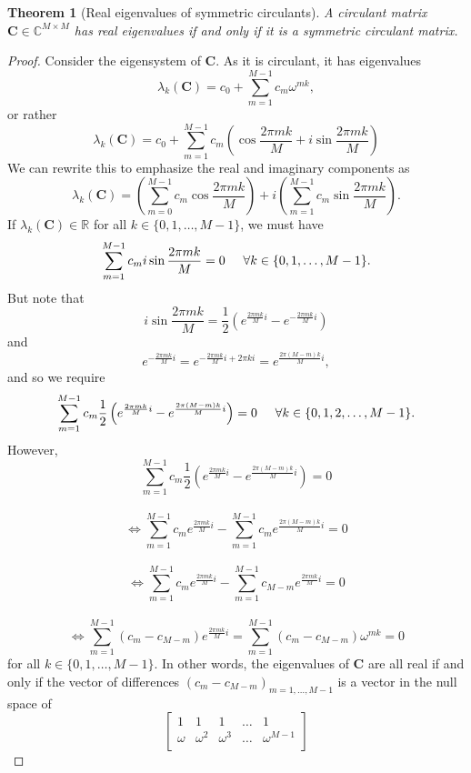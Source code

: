 \documentclass[letterpaper,12pt,oneside,final]{article}
\newtheorem{theorem}{Theorem}
\newcommand{\m}[1]{\mathbf{#1}}               %
\newcommand{\field}[1]{\mathbb{#1}}
\newcommand{\Reals}{\field{R}}
\newcommand{\Complex}{\field{C}}
\begin{document}
\begin{theorem}[Real eigenvalues of symmetric circulants] \label{thm:symmEigen}
  A circulant matrix $\m{C} \in \Complex^{M \times M}$ has real eigenvalues if and only if it is a symmetric circulant matrix.
\end{theorem}
\begin{proof}
  Consider the eigensystem of $\m{C}$. As it is circulant, it has eigenvalues
  $$\lambda_k (\m{C}) = c_0 + \sum_{m = 1}^{M-1} c_m \omega^{mk},$$
  or rather
  $$\lambda_k (\m{C}) = c_0 + \sum_{m = 1}^{M-1} c_m \left ( \cos \frac{2\pi mk}{M} + i \sin \frac{2\pi mk}{M} \right )$$
  We can rewrite this to emphasize the real and imaginary components as
  $$\lambda_k (\m{C}) = \left ( \sum_{m = 0}^{M-1} c_m \cos \frac{2\pi mk}{M} \right ) + i \left ( \sum_{m = 1}^{M-1} c_m \sin \frac{2\pi mk}{M} \right ).$$
  If $\lambda_k (\m{C}) \in \Reals$ for all $k \in \{0, 1, \dots, M-1\}$, we must have
  $$\sum_{m = 1}^{M-1} c_m i \sin \frac{2\pi mk}{M} = 0 \hspace{0.5cm} \forall k \in \{0, 1, \dots, M-1\}.$$
  But note that
  $$i \sin \frac{2\pi mk}{M} = \frac{1}{2} \left ( e^{\frac{2\pi mk}{M} i} - e^{-\frac{2\pi mk}{M} i} \right )$$
  and
  $$e^{-\frac{2\pi mk}{M} i} = e^{-\frac{2\pi mk}{M} i + 2\pi ki} = e^{\frac{2\pi (M - m)k}{M} i},$$
  and so we require
  $$\sum_{m = 1}^{M-1} c_m \frac{1}{2} \left ( e^{\frac{2\pi mk}{M}i} - e^{\frac{2\pi (M-m)k}{M}i} \right ) = 0 \hspace{0.5cm} \forall k \in \{0, 1, 2, \dots, M-1\}.$$
  However,
  $$\sum_{m = 1}^{M-1} c_m \frac{1}{2} \left ( e^{\frac{2\pi mk}{M}i} - e^{\frac{2\pi (M-m)k}{M}i} \right ) = 0$$
  \\
  $$\iff \sum_{m = 1}^{M-1} c_m e^{\frac{2\pi mk}{M}i} - \sum_{m = 1}^{M-1} c_m e^{\frac{2\pi (M-m)k}{M}i} = 0$$
  \\
  $$\iff \sum_{m = 1}^{M-1} c_m e^{\frac{2\pi mk}{M}i} - \sum_{m = 1}^{M-1} c_{M-m} e^{\frac{2\pi mk}{M}i} = 0$$
  \\
  $$\iff \sum_{m = 1}^{M-1} ( c_m - c_{M-m} ) e^{\frac{2\pi mk}{M}i} = \sum_{m = 1}^{M-1} ( c_m - c_{M-m} ) \omega^{mk} = 0$$
  for all $k \in \{0, 1, \dots, M-1\}$. In other words, the eigenvalues of $\m{C}$ are all real if and only if the vector of differences $(c_m - c_{M-m})_{m=1,\dots,M-1}$ is a vector in the null space of
  $$\begin{bmatrix}
  1 & 1 & 1 & \dots & 1 \\
  \omega & \omega^2 & \omega^3 & \dots & \omega^{M-1} \\

\end{bmatrix}$$
\end{proof}
\end{document}
